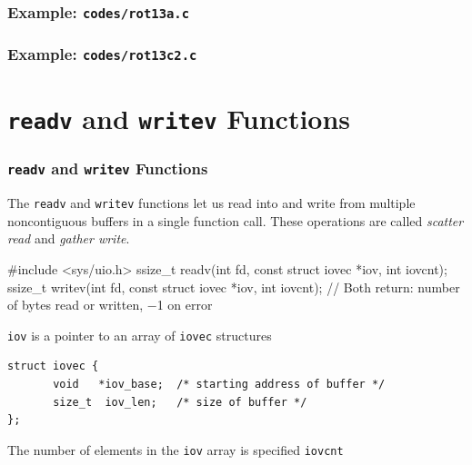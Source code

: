 \documentclass[newPxFont,sthlmFooter,nooffset]{beamer}
\begin{document}
\begin{frame}
  \frametitle{Example: \texttt{codes/rot13a.c}}
    

\end{frame}


\begin{frame}
  \frametitle{Example: \texttt{codes/rot13c2.c}}
    

\end{frame}


\section{\texttt{readv} and \texttt{writev} Functions}

\begin{frame}[t, fragile]
  \frametitle{\texttt{readv} and \texttt{writev} Functions}
The \texttt{readv} and \texttt{writev} functions let us read into and write from multiple noncontiguous buffers in a single function call. These operations are called \textit{scatter read} and \textit{gather write}.
\begin{codedef}
#include <sys/uio.h>
ssize_t readv(int fd, const struct iovec *iov, int iovcnt); 
ssize_t writev(int fd, const struct iovec *iov, int iovcnt);
// Both return: number of bytes read or written, −1 on error
\end{codedef}

\texttt{iov} is a pointer to an array of \texttt{iovec} structures
{\footnotesize
\begin{verbatim}
struct iovec {
       void   *iov_base;  /* starting address of buffer */
       size_t  iov_len;   /* size of buffer */
};
\end{verbatim}
}

The number of elements in the \texttt{iov} array is specified \texttt{iovcnt}
\end{frame}
\end{document}
